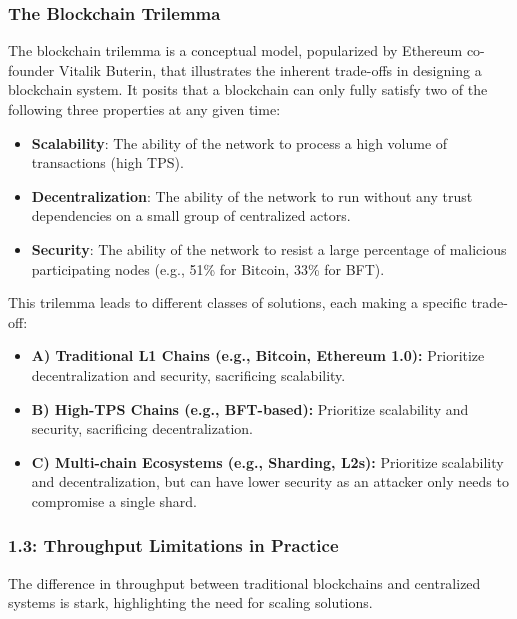 \subsubsection{The Blockchain
Trilemma}\label{the-blockchain-trilemma}

The blockchain trilemma is a conceptual model, popularized by Ethereum
co-founder Vitalik Buterin, that illustrates the inherent trade-offs in
designing a blockchain system. It posits that a blockchain can only
fully satisfy two of the following three properties at any given time:

\begin{itemize}
\tightlist
\item
  \textbf{Scalability}: The ability of the network to process a high
  volume of transactions (high TPS).
\item
  \textbf{Decentralization}: The ability of the network to run without
  any trust dependencies on a small group of centralized actors.
\item
  \textbf{Security}: The ability of the network to resist a large
  percentage of malicious participating nodes (e.g., 51\% for Bitcoin,
  33\% for BFT).
\end{itemize}



This trilemma leads to different classes of solutions, each making a
specific trade-off:

\begin{itemize}
\tightlist
\item
  \textbf{A) Traditional L1 Chains (e.g., Bitcoin, Ethereum 1.0):}
  Prioritize decentralization and security, sacrificing scalability.
\item
  \textbf{B) High-TPS Chains (e.g., BFT-based):} Prioritize scalability
  and security, sacrificing decentralization.
\item
  \textbf{C) Multi-chain Ecosystems (e.g., Sharding, L2s):} Prioritize
  scalability and decentralization, but can have lower security as an
  attacker only needs to compromise a single shard.
\end{itemize}

\subsubsection{1.3: Throughput Limitations in
Practice}\label{throughput-limitations-in-practice}

The difference in throughput between traditional blockchains and
centralized systems is stark, highlighting the need for scaling
solutions.

